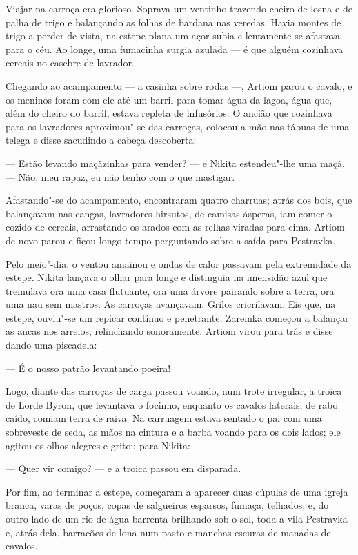 Viajar na carroça era glorioso. Soprava um ventinho trazendo cheiro de
losna e de palha de trigo e balançando as folhas de bardana nas veredas.
Havia montes de trigo a perder de vista, na estepe plana um açor subia e
lentamente se afastava para o céu. Ao longe, uma fumacinha surgia
azulada --- é que alguém cozinhava cereais no casebre de lavrador.

Chegando ao acampamento --- a casinha sobre rodas ---, Artiom parou o
cavalo, e os meninos foram com ele até um barril para tomar água da
lagoa, água que, além do cheiro do barril, estava repleta de infusórios. O
ancião que cozinhava para os lavradores aproximou"-se das carroças,
colocou a mão nas tábuas de uma telega e disse sacudindo a cabeça
descoberta:

--- Estão levando maçãzinhas para vender? --- e Nikita estendeu"-lhe uma
maçã. --- Não, meu rapaz, eu não tenho com o que mastigar.

Afastando"-se do acampamento, encontraram quatro charruas; atrás dos
bois, que balançavam nas cangas, lavradores hirsutos, de camisas
ásperas, iam comer o cozido de cereais, arrastando os arados com as
relhas viradas para cima. Artiom de novo parou e ficou longo tempo
perguntando sobre a saída para Pestravka.

Pelo meio"-dia, o ventou amainou e ondas de calor passavam pela
extremidade da estepe. Nikita lançava o olhar para longe e distinguia na
imensidão azul que tremulava ora uma casa flutuante, ora uma árvore
pairando sobre a terra, ora uma nau sem mastros. As carroças avançavam.
Grilos cricrilavam. Eis que, na estepe, ouviu"-se um repicar contínuo e
penetrante. Zaremka começou a balançar as ancas nos arreios, relinchando
sonoramente. Artiom virou para trás e disse dando uma piscadela:

--- É o nosso patrão levantando poeira!

Logo, diante das carroças de carga passou voando, num trote irregular, a
troica de Lorde Byron, que levantava o focinho, enquanto os cavalos
laterais, de rabo caído, comiam terra de raiva. Na carruagem estava
sentado o pai com uma sobreveste de seda, as mãos na cintura e a barba
voando para os dois lados; ele agitou os olhos alegres e gritou para
Nikita:

--- Quer vir comigo? --- e a troica passou em disparada.

Por fim, ao terminar a estepe, começaram a aparecer duas cúpulas de uma
igreja branca, varas de poços, copas de salgueiros esparsos, fumaça,
telhados, e, do outro lado de um rio de água barrenta brilhando sob o
sol, toda a vila Pestravka e, atrás dela, barracões de lona num
pasto e manchas escuras de manadas de cavalos.

